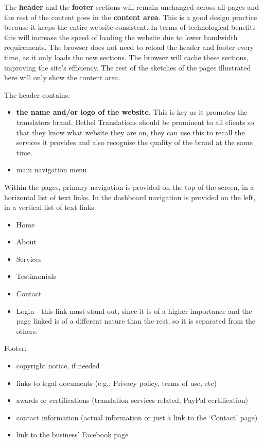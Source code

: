 \documentclass{l3proj}
\begin{document}
The \textbf{header} and the \textbf{footer} sections will remain unchanged
across all pages and the rest of the content goes in the \textbf{content area}.
This is a good design practice because it keeps the entire website consistent. In 
terms of technological benefits this will increase the speed of loading the website 
due to lower bandwidth requirements. The browser does not need to reload the header 
and footer every time, as it only loads the new sections. The browser will cache
these sections, improving the site's efficiency. The rest of the sketches of the pages illustrated here will only show the
content area.

The header contains:
\begin{itemize} \itemsep1pt \parskip0pt 
	\item \textbf{the name and/or logo of the website.} This is key as it
promotes the translators brand. Bethel Translations should be prominent to all
clients so that they know what website they are on, they can use this to recall
the services it provides and also recognise the quality of the brand at the same
time. 
	\item main navigation menu
\end{itemize}

Within the pages, primary navigation is provided on the top of the
screen, in a horizontal list of text links. In the dashboard navigation is
provided on the left, in a vertical list of text links.
\begin{itemize} \itemsep1pt \parskip0pt 
	\item Home
	\item About
	\item Services
	\item Testimonials
	\item Contact
	\item Login - this link must stand out, since it is of a higher
	importance and the page linked is of a different nature than the rest,
	so it is separated from the others.
\end{itemize}


Footer:
\begin{itemize} \itemsep1pt \parskip0pt 
	\item copyright notice, if needed
	\item links to legal documents (e.g.: Privacy policy, terms of use, etc)
	\item awards or certifications (translation services related, 
	PayPal certification)
	\item contact information (actual information or just a link to the 
	`Contact’ page)
	\item link to the business’ Facebook page
\end{itemize}
\end{document}
